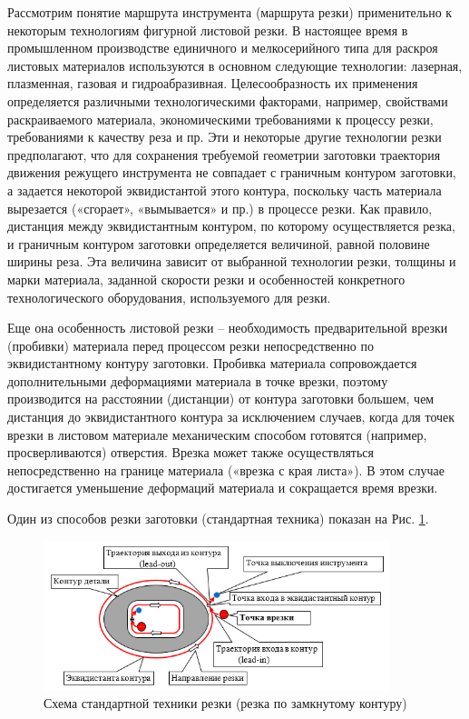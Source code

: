 \documentclass{article}
\begin{document}
Рассмотрим понятие маршрута инструмента (маршрута резки)
применительно к некоторым технологиям фигурной листовой резки.
В настоящее время в промышленном производстве
единичного и мелкосерийного типа для раскроя листовых материалов
используются в основном следующие технологии:
лазерная, плазменная, газовая и гидроабразивная.
Целесообразность их применения определяется различными технологическими факторами,
например, свойствами раскраиваемого материала,
экономическими требованиями к процессу резки,
требованиями к качеству реза и пр.
Эти и некоторые другие технологии резки предполагают,
что для сохранения требуемой геометрии заготовки
траектория движения режущего инструмента не совпадает
с граничным контуром заготовки,
а задается некоторой эквидистантой этого контура,
поскольку часть материала вырезается («сгорает», «вымывается» и пр.)
в процессе резки.
Как правило, дистанция между эквидистантным контуром,
по которому осуществляется резка, и граничным контуром заготовки определяется величиной,
равной половине ширины реза.
Эта величина зависит от выбранной технологии резки,
толщины и марки материала, заданной скорости резки
и особенностей конкретного технологического оборудования,
используемого для резки.

Еще она особенность листовой резки –
необходимость предварительной врезки (пробивки)
материала перед процессом резки непосредственно
по эквидистантному контуру заготовки.
Пробивка материала сопровождается дополнительными
деформациями материала в точке врезки,
поэтому производится на расстоянии (дистанции)
от контура заготовки большем,
чем дистанция до эквидистантного контура за исключением случаев,
когда для точек врезки в листовом материале механическим способом
готовятся (например, просверливаются)
отверстия.
Врезка может также осуществляться
непосредственно на границе материала
(«врезка с края листа»).
В этом случае достигается уменьшение
деформаций материала и сокращается время врезки.

Один из способов резки заготовки (стандартная техника)
показан на Рис. \ref{standard-cutting}.

\begin{figure}
  \begin{center}
  \includegraphics[width=0.9\textwidth]{cutting-path.png}
  \caption{Схема стандартной техники резки (резка по замкнутому контуру)}
  \label{standard-cutting}
  \end{center}
\end{figure}
\end{document}
